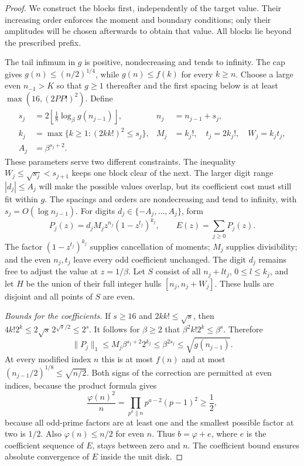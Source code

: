 \begin{proof}
We construct the blocks first, independently of the target value.
Their increasing order enforces the moment and boundary conditions;
only their amplitudes will be chosen afterwards to obtain that value.
All blocks lie beyond the prescribed prefix.

The tail infimum in $g$ is positive, nondecreasing and tends to infinity.
The cap gives $g(n)\le(n/2)^{1/4}$, while $g(n)\le f(k)$ for every
$k\ge n$. Choose a large even $n_{-1}>K$ so that $g\ge1$ thereafter
and the first spacing below is at least $\max(16,(2PP!)^2)$. Define
\[
 \begin{aligned}
 s_j&=2\left\lfloor\tfrac18\log_\beta g(n_{j-1})\right\rfloor,
 &n_j&=n_{j-1}+s_j,\\
 k_j&=\max\{k\ge1:(2kk!)^2\le s_j\},
 &M_j&=k_j!,\quad t_j=2k_j!,\quad W_j=k_jt_j,\\
 A_j&=\beta^{s_j+2}.
 \end{aligned}
\]
These parameters serve two different constraints. The inequality
$W_j\le\sqrt{s_j}<s_{j+1}$ keeps one block clear of the next.
The larger digit range $|d_j|\le A_j$ will make the possible values
overlap, but its coefficient cost must still fit within $g$.
The spacings and orders are nondecreasing and tend to infinity,
with $s_j=O(\log n_{j-1})$. For digits
$d_j\in\{-A_j,\ldots,A_j\}$, form
\[
 P_j(z)=d_jM_jz^{n_j}(1-z^{t_j})^{k_j},\qquad E(z)=\sum_{j\ge0}P_j(z).
\]
The factor $(1-z^{t_j})^{k_j}$ supplies cancellation of moments;
$M_j$ supplies divisibility; and the even $n_j,t_j$ leave every odd
coefficient unchanged. The digit $d_j$ remains free to adjust the value
at $z=1/\beta$.
Let $S$ consist of all $n_j+lt_j$, $0\le l\le k_j$, and let $H$ be
the union of their full integer hulls $[n_j,n_j+W_j]$. These hulls are
disjoint and all points of $S$ are even.

\emph{Bounds for the coefficients.} If $s\ge16$ and $2kk!\le\sqrt s$, then
$4k!2^k\le2\sqrt s\,2^{\sqrt s/2}\le2^s$. It follows for $\beta\ge2$
that $\beta^2k!2^k\le\beta^s$. Therefore
\begin{equation}\label{long249:eq:signed-budget}
 \|P_j\|_1\le M_j\beta^{s_j+2}2^{k_j}
 \le\beta^{2s_j}\le\sqrt{g(n_{j-1})}.
\end{equation}
At every modified index $n$ this is at most $f(n)$ and at most
$(n_{j-1}/2)^{1/8}\le\sqrt{n/2}$. Both signs of the correction are permitted at even indices, because
the product formula gives
\[
 \frac{\varphi(n)^2}{n}
 =\prod_{p^a\parallel n}p^{a-2}(p-1)^2\ge\frac12,
\]
because all odd-prime factors are at least one and the smallest possible
factor at two is $1/2$. Also $\varphi(n)\le n/2$ for even $n$.
Thus $b=\varphi+e$, where $e$ is the coefficient sequence of $E$, stays
between zero and $n$. The coefficient bound ensures absolute convergence
of $E$ inside the unit disk.


\end{proof}
